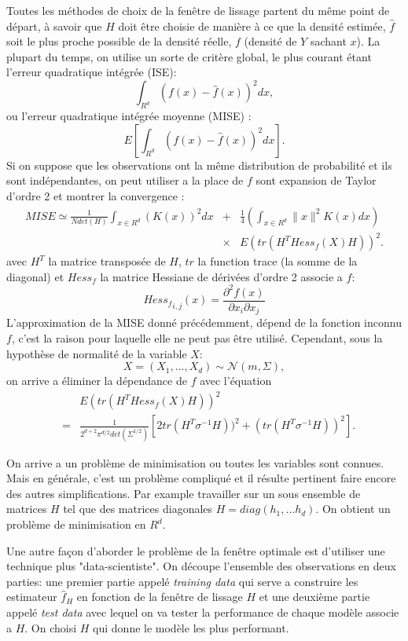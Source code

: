 \documentclass[12pt, a4paper]{book}
\begin{document}
Toutes les méthodes de choix de la fenêtre de lissage partent du même point de départ, à savoir que $H$ doit être choisie de manière à ce que la densité estimée, $\hat{f}$ soit le plus proche  possible de la densité réelle, $f$ (densité de $Y$ sachant $x$). La plupart du temps, on utilise un sorte de critère global, le plus courant étant l'erreur quadratique intégrée (ISE):
$$\int_{R^d} (f(x)-\hat{f}(x))^2 dx,$$
ou l'erreur quadratique intégrée moyenne (MISE) :
$$E\left[\int_{R^d} (f(x)-\hat{f}(x))^2 dx\right].$$
Si on suppose que les observations  ont la même distribution de probabilité et ils sont indépendantes, on peut utiliser a la place de $f$ sont expansion de Taylor d'ordre 2 et montrer la convergence :
\begin{eqnarray}
MISE \simeq \frac{1}{N det(H)}\int_{x\in R^d} (K(x))^2 dx&+&\frac{1}{4}\left( \int_{x\in R^d} \|x\|^2 K(x) dx \right)\nonumber\\
&\times&E(tr(H^T Hess_f (X) H))^2.\nonumber
\end{eqnarray}
avec $H^T$ la matrice transposée de $H$, $tr$ la function trace (la somme de la diagonal) et $Hess_f$ la matrice Hessiane de dérivées d'ordre 2 associe a $f$:
$${Hess_f}_{i,j}(x) = \frac{\partial^2 f(x)}{\partial x_i\partial x_j}$$
L'approximation de la MISE donné précédemment, dépend de la fonction inconnu $f$, c'est la raison pour laquelle elle ne peut pas être utilisé.  Cependant, sous la hypothèse de normalité de la variable $X$:
$$X= (X_1,\ldots,X_d)\sim \mathcal{N}(m, \Sigma),$$
on arrive a éliminer la dépendance de $f$ avec l'équation
\begin{eqnarray}
&& E(tr(H^T Hess_f (X) H))^2\nonumber\\
&=&\frac{1}{2^{d+2}\pi^{d/2}det(\Sigma^{1/2})}\left[ 2tr(H^T \sigma^{-1} H))^2  + (tr(H^T \sigma^{-1} H))^2\right].\nonumber
\end{eqnarray}
$$ $$

On arrive a un problème de minimisation ou toutes les variables sont connues. Mais en générale, c'est un problème compliqué et il résulte pertinent faire encore des autres simplifications. Par example travailler sur un sous ensemble de matrices $H$ tel que des matrices diagonales $H= diag(h_1,\ldots h_d)$. On obtient un problème de minimisation en $R^d$.


\bigskip

Une autre façon d'aborder le problème de la fenêtre optimale est d'utiliser une technique plus "data-scientiste". On découpe l'ensemble des observations en deux parties: une premier partie appelé {\it training data} qui serve a construire les estimateur $\hat{f}_H$ en fonction de la fenêtre de lissage $H$ et une deuxième partie appelé {\it test data} avec lequel on va tester la performance de chaque modèle associe a $H$. On choisi $H$ qui donne le modèle les plus performant. 
\end{document}

